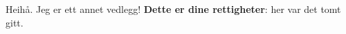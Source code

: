 Heihå. Jeg er ett annet vedlegg!\newline
\textbf{Dette er dine rettigheter}:\newline
her var det tomt gitt.

